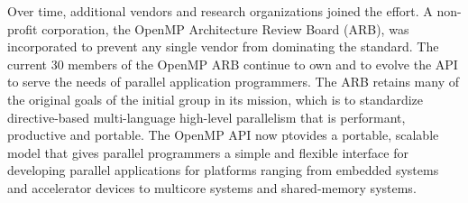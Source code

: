 Over time, additional vendors and research organizations joined the effort.  A
non-profit corporation, the OpenMP Architecture Review Board (ARB), was 
incorporated to prevent any single vendor from dominating the standard.
The current 30 members of the OpenMP ARB continue to own and to evolve 
the API to serve the needs of parallel application programmers. The ARB
retains many of the original goals of the initial group in its mission,
which is to standardize directive-based multi-language high-level 
parallelism that is performant, productive and portable. The OpenMP 
API now ptovides a portable, scalable model that gives parallel 
programmers a simple and flexible interface for developing parallel 
applications for platforms ranging from embedded systems and accelerator 
devices to multicore systems and shared-memory systems.


